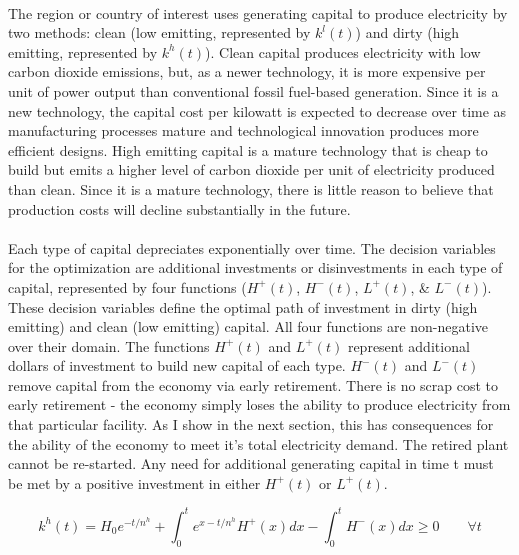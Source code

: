 \documentclass{article}
\begin{document}
\paragraph{} The region or country of interest uses generating capital to produce electricity by two methods: clean (low emitting, represented by $k^l(t)$) and dirty (high emitting, represented by $k^h(t)$). Clean capital produces electricity with low carbon dioxide emissions, but, as a newer technology, it is more expensive per unit of power output than conventional fossil fuel-based generation. Since it is a new technology, the capital cost per kilowatt is expected to decrease over time as manufacturing processes mature and technological innovation produces more efficient designs. High emitting capital is a mature technology that is cheap to build but emits a higher level of carbon dioxide per unit of electricity produced than clean. Since it is a mature technology, there is little reason to believe that production costs will decline substantially in the future. 


\paragraph{} Each type of capital depreciates exponentially over time. The decision variables for the optimization are additional investments or disinvestments in each type of capital, represented by four functions ($H^+(t)$, $H^-(t)$, $L^+(t)$, \& $L^-(t)$). These decision variables define the optimal path of investment in dirty (high emitting) and clean (low emitting) capital. All four functions are non-negative over their domain. The functions $H^+(t)$ and $L^+(t)$ represent additional dollars of investment to build new capital of each type. $H^-(t)$ and $L^-(t)$ remove capital from the economy via early retirement. There is no scrap cost to early retirement - the economy simply loses the ability to produce electricity from that particular facility. As I show in the next section, this has consequences for the ability of the economy to meet it's total electricity demand. The retired plant cannot be re-started. Any need for additional generating capital in time t must be met by a positive investment in either $H^+(t)$ or $L^+(t)$. 

\begin{equation}\label{eq:simpleHCapitalConstraint}
k^h(t) = H_0 e^{-t/n^h} + \int_0^t e^{x-t/n^h} H^+(x) dx - \int_0^t H^-(x)dx \geq 0 \qquad \forall t
\end{equation}
\end{document}

